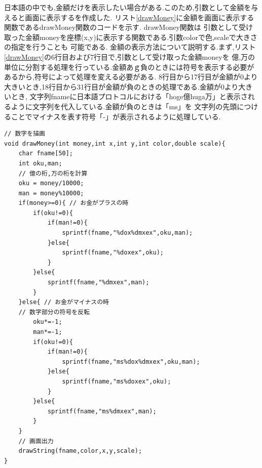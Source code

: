 \documentclass[a4j]{jarticle}
\begin{document}
    日本語の中でも,金額だけを表示したい場合がある.このため,引数として金額を与えると画面に表示するを作成した.
    リスト\ref{drawMoney}に金額を画面に表示する関数であるdrawMoney関数のコードを示す. drawMoney関数は
    引数として受け取った金額moneyを座標(x,y)に表示する関数である.引数colorで色,scaleで大きさの指定を行うことも
    可能である. 金額の表示方法について説明する.まず,リスト\ref{drawMoney}の6行目および7行目で,引数として受け取った金額moneyを
    億,万の単位に分割する処理を行っている.金額あｇ負のときには符号を表示する必要があるから,符号によって処理を変える必要がある.
    8行目から17行目が金額が0より大きいとき,18行目から31行目が金額が負のときの処理である.金額が0より大きいとき,
    文字列fnameに日本語プロトコルにおける「hoge億huga万」と表示されるように文字列を代入している.金額が負のときは「ms」を
    文字列の先頭につけることでマイナスを表す符号「-」が表示されるように処理している.
    \begin{lstlisting}[basicstyle=\ttfamily\footnotesize, frame=single,label=drawMoney,caption=drawMoney関数]
// 数字を描画
void drawMoney(int money,int x,int y,int color,double scale){
    char fname[50];
    int oku,man;
    // 億の桁,万の桁を計算
    oku = money/10000;
    man = money%10000;
    if(money>=0){ // お金がプラスの時
        if(oku!=0){
            if(man!=0){
                sprintf(fname,"%dox%dmxex",oku,man);
            }else{
                sprintf(fname,"%doxex",oku);
            }
        }else{
            sprintf(fname,"%dmxex",man);
        }
    }else{ // お金がマイナスの時
    // 数字部分の符号を反転
        oku*=-1;
        man*=-1;
        if(oku!=0){
            if(man!=0){
                sprintf(fname,"ms%dox%dmxex",oku,man);
            }else{
                sprintf(fname,"ms%doxex",oku);
            }
        }else{
            sprintf(fname,"ms%dmxex",man);
        }        
    }
    // 画面出力
    drawString(fname,color,x,y,scale);
}  
    \end{lstlisting} 
\end{document}
